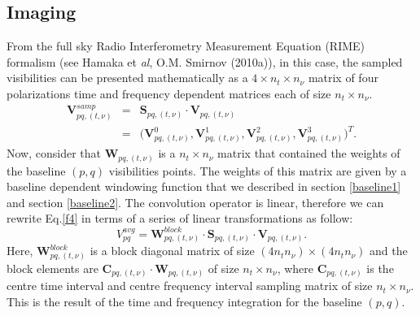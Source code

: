 \documentclass[useAMS,usenatbib]{mn2e}
\begin{document}
\subsection{Imaging}
\label{sec:imaging}
From the full sky Radio Interferometry Measurement Equation (RIME) formalism (see Hamaka et \textit{al}, O.M. Smirnov (2010a)), in this 
case, the sampled visibilities can be presented mathematically as a $4\times n_t\times n_{\nu}$ matrix of four polarizations time and 
frequency dependent matrices each of size $n_t\times n_{\nu}$.
\begin{eqnarray*}
\mathbf{V}_{pq,(t,\nu)}^{samp}&=&\mathcal{\textbf{S}}_{pq,(t,\nu)}\cdot\mathbf{V}_{pq,(t,\nu)}\\
			      &=&\Bigg(\mathbf{V}_{pq,(t,\nu)}^{0},\mathbf { V } 
^1_{pq,(t,\nu)},\mathbf{V}^2_{pq,(t,\nu)},\mathbf{V}_{pq,(t,\nu)}^{3 } \Bigg)^T. \label{eqx:conv}
\end{eqnarray*}
Now, consider that $\mathcal{\textbf{W}}_{pq,(t,\nu)}$ is a $n_t \times n_{\nu}$ matrix that contained the weights of the baseline $(p,q)$ 
visibilities points. The weights of this matrix are given by a baseline dependent windowing function that we described in section 
\ref{baseline1} and section \ref{baseline2}.
The convolution operator is linear, therefore we can rewrite Eq.\ref{f4} in terms of a series of linear transformations as follow:
\begin{equation}
V_{pq}^{avg}= \mathbf{W}_{pq,(t,\nu)}^{block}\cdot 
\mathbf{S}_{pq,(t,\nu)}\cdot\mathbf{V}_{pq,(t,\nu)}.\label{eqbb:linear}
\end{equation}
Here, $\mathbf{W}_{pq,(t,\nu)}^{block}$ is a block diagonal matrix of size $(4n_t n_{\nu})\times(4n_t n_{\nu})$ and the 
block elements are $\mathbf{C}_{pq,(t,\nu)}\cdot\mathcal{\textbf{W}}_{pq,(t,\nu)}$ of size $n_t\times n_{\nu}$, where 
$\mathbf{C}_{pq,(t,\nu)}$ is the centre time interval and centre frequency interval sampling matrix of size $n_t\times n_{\nu}$. This
is the result of the time and frequency integration for the baseline $(p,q)$.
\end{document}
